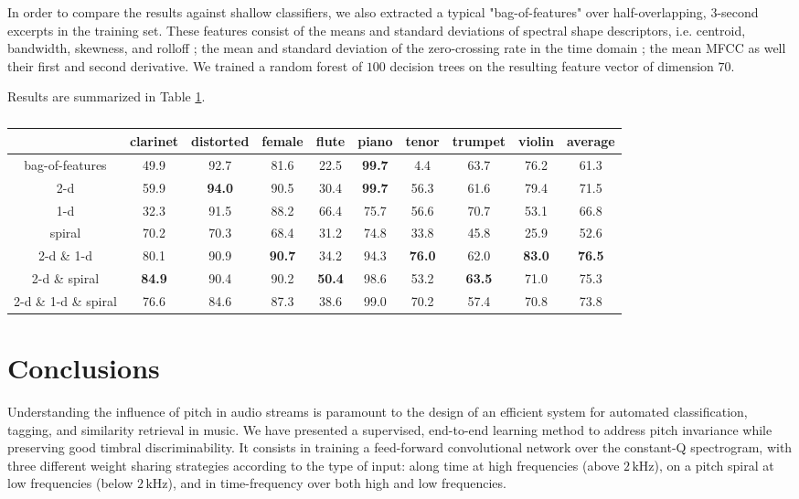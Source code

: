 \documentclass{article}
\makeatletter
\newcommand*{\ie}{i.e.\@\xspace}
\makeatother
\begin{document}
In order to compare the results against shallow classifiers, we also extracted a typical
"bag-of-features" over half-overlapping, 3-second excerpts in the training set.
These features consist of the means and standard
deviations of spectral shape descriptors, \ie centroid, bandwidth, skewness,
and rolloff ; the mean and standard deviation of the zero-crossing rate in the time domain ;
the mean MFCC as well their first and second derivative.
We trained a random forest of $100$ decision trees on the resulting feature vector
of dimension $70$.

Results are summarized in Table \ref{table:results}.

\begin{table}[t]
	\begin{center}
	\setlength{\unitlength}{1cm}
	\begin{tabular}{|c|cccccccc|c|}
		\hline
		& clarinet & distorted & female & flute & piano & tenor & trumpet & violin & average \\
		\hline
		bag-of-features
		& 49.9 & 92.7 & 81.6 & 22.5 & \textbf{99.7} & \hphantom{0}4.4 & 63.7 & 76.2 & 61.3 \\
		\hline
		
		2-d
		& 59.9 & \textbf{94.0} & 90.5 & 30.4 & \textbf{99.7} & 56.3 & 61.6 & 79.4 & 71.5 \\
		1-d
		& 32.3 & 91.5 & 88.2 & 66.4 & 75.7 & 56.6 & 70.7 & 53.1 & 66.8 \\
		spiral
		& 70.2 & 70.3 & 68.4 & 31.2 & 74.8 & 33.8 & 45.8 & 25.9 & 52.6 \\
		\hline
		2-d \& 1-d
		& 80.1 & 90.9 & \textbf{90.7} & 34.2 & 94.3 & \textbf{76.0} & 62.0 & \textbf{83.0} & \textbf{76.5} \\
		2-d \& spiral
		& \textbf{84.9} & 90.4 & 90.2 & \textbf{50.4} & 98.6 & 53.2 & \textbf{63.5} & 71.0 & 75.3\\
		\hline
		2-d \& 1-d \& spiral
		& 76.6 & 84.6 & 87.3 & 38.6 & 99.0 & 70.2 & 57.4 & 70.8 & 73.8  \\
		\hline
	\end{tabular}
	\end{center}
	\caption{\label{table:results}}
\end{table}


\section{Conclusions}
Understanding the influence of pitch in audio streams is paramount to the design of
an efficient system for automated classification, tagging, and similarity retrieval in music. 
We have presented a supervised, end-to-end learning method to address pitch invariance
while preserving good timbral discriminability.
It consists in training a feed-forward convolutional network over the constant-Q spectrogram,
with three different weight sharing strategies according to the type of input:
along time at high frequencies (above $2\,\mathrm{kHz}$),
on a pitch spiral at low frequencies (below $2\,\mathrm{kHz}$),
and in time-frequency over both high and low frequencies.
\end{document}
